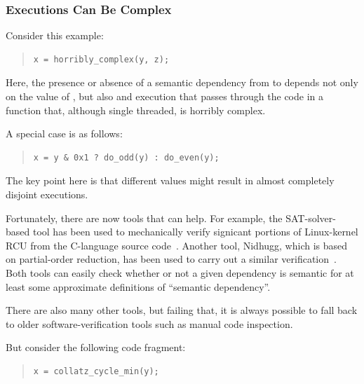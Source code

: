 \documentclass[10]{article}
\begin{document}
\subsubsection{Executions Can Be Complex}
\label{sec:Executions Can Be Complex}

Consider this example:

\begin{quote}
\begin{verbatim}
x = horribly_complex(y, z);
\end{verbatim}
\end{quote}

Here, the presence or absence of a semantic dependency from  to
 depends not only on the value of , but also and execution
that passes through the code in a function that, although single threaded,
is horribly complex.

A special case is as follows:

\begin{quote}
\begin{verbatim}
x = y & 0x1 ? do_odd(y) : do_even(y);
\end{verbatim}
\end{quote}

The key point here is that different values might result in almost
completely disjoint executions.

Fortunately, there are now tools that can help.
For example, the SAT-solver-based  tool
has been used to mechanically verify signicant portions of Linux-kernel
RCU from the C-language source
code~\cite{LihaoLiang2016VerifyTreeRCU,LanceRoy2017CBMC-SRCU}.
Another tool, Nidhugg, which is based on partial-order
reduction, has been used to carry out a similar
verification~\cite{MichalisKokologiannakis2017NidhuggRCU,SMC-TreeRCU,MichalisKokologiannakis2019RCUstatelessModelCheck}.
Both tools can easily check whether or not a given dependency is semantic
for at least some approximate definitions of ``semantic dependency''.

There are also many other tools, but failing that, it is always possible
to fall back to older software-verification tools such as manual
code inspection.

But consider the following code fragment:

\begin{quote}
\begin{verbatim}
x = collatz_cycle_min(y);
\end{verbatim}
\end{quote}
\end{document}
